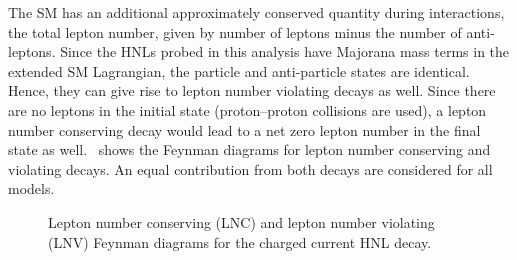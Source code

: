 The SM has an additional approximately conserved quantity during interactions, the total lepton number, given by number of leptons minus the number of anti-leptons. Since the HNLs probed in this analysis have Majorana mass terms in the extended SM Lagrangian, the particle and anti-particle states are identical. Hence, they can give rise to lepton number violating decays as well. Since there are no leptons in the initial state (proton--proton collisions are used), a lepton number conserving decay would lead to a net zero lepton number in the final state as well.~ shows the Feynman diagrams for lepton number conserving and violating decays. An equal contribution from both decays are considered for all models.

\begin{figure}[ht!]
\centering
{}
\caption{Lepton number conserving (LNC) and lepton number violating (LNV) Feynman diagrams for the charged current HNL decay.}
\label{fig:feynman_lnc_lnv}
\end{figure}

